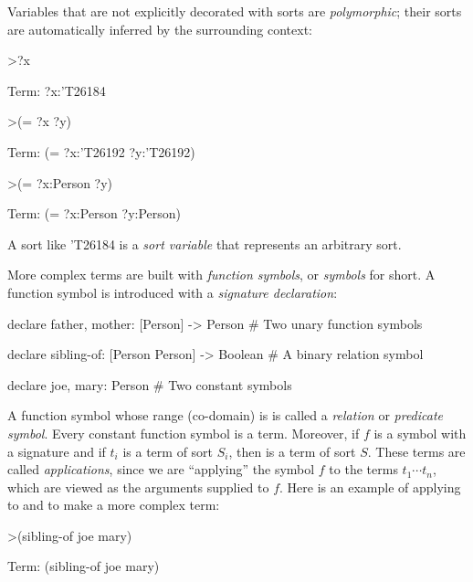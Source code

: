 

Variables that are not explicitly decorated with sorts are \emph{polymorphic}; their sorts are automatically inferred by the surrounding context:
\begin{tcAthena}[upquote=true]
>?x

Term: ?x:'T26184

>(= ?x ?y)

Term: (= ?x:'T26192 ?y:'T26192)

>(= ?x:Person ?y)

Term: (= ?x:Person ?y:Person)
\end{tcAthena}
A sort like {\ttfamily 'T26184} is a {\em sort variable\/} that represents an arbitrary sort. 

More complex terms are built with {\em function symbols}, or {\em symbols\/} for short. A function symbol is introduced with a {\em signature declaration}:
\begin{tcAthena}[upquote=true]
declare father, mother: [Person] -> Person      # Two unary function symbols

declare sibling-of: [Person Person] -> Boolean  # A binary relation symbol

declare joe, mary: Person                       # Two constant symbols
\end{tcAthena}
A function symbol whose range (co-domain) is  is called a \emph{relation} or {\em predicate symbol}.
Every constant function symbol is a term. Moreover, if $f$ is a symbol with a signature  and if $t_i$ is a term of sort $S_i$,
then  is a term of sort $S$. These terms are called {\em applications}, since we are ``applying'' the symbol $f$
to the terms $t_1 \cdots t_n$, which are viewed as the arguments supplied to $f$. Here is an example of applying  to  and  to make a more complex term: 
\begin{tcAthena}[upquote=true]
>(sibling-of joe mary)

Term: (sibling-of joe mary)
\end{tcAthena}

